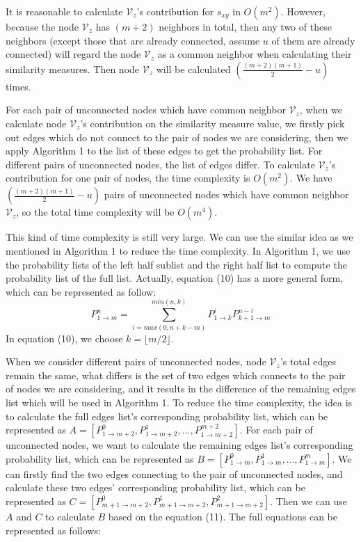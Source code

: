 \documentclass[\main/thesis.tex]{subfiles}
\begin{document}
It is reasonable to calculate $\mathcal{V}_z$'s contribution for $s_{xy}$ in $O(m^2)$. However, because the node $\mathcal{V}_z$ has $(m+2)$ neighbors in total, then any two of these neighbors (except those that are already connected, assume $u$ of them are already connected) will regard the node $\mathcal{V}_z$ as a common neighbor when calculating their similarity measures. Then node $\mathcal{V}_z$ will be calculated $(\frac{(m+2)(m+1)}{2}-u)$ times. 


For each pair of unconnected nodes which have common neighbor $\mathcal{V}_z$, when we calculate node $\mathcal{V}_z$'s contribution on the similarity measure value, we firstly pick out edges which do not connect to the pair of nodes we are considering, then we apply Algorithm 1 to the list of these edges to get the probability list. For different pairs of unconnected nodes, the list of edges differ. To calculate $\mathcal{V}_z$'s contribution for one pair of nodes, the time complexity is $O(m^2)$. We have $(\frac{(m+2)(m+1)}{2}-u)$ pairs of unconnected nodes which have common neighbor $\mathcal{V}_z$, so the total time complexity will be $O(m^4)$.

This kind of time complexity is still very large. We can use the similar idea as we mentioned in Algorithm 1 to reduce the time complexity. In Algorithm 1, we use the probability lists of the left half sublist and the right half list to compute the probability list of the full list. Actually, equation (10) has a more general form, which can be represented as follow:
\begin{equation}
P_{1\rightarrow m}^n=\sum_{i=max(0,n+k-m)}^{min(n,k)}P_{1\rightarrow k}^i P_{k+1\rightarrow m}^{n-i}
\end{equation}
In equation (10), we choose $k=\lfloor m/2 \rfloor$.

When we consider different pairs of unconnected nodes, node $\mathcal{V}_z$'s total edges remain the same, what differs is the set of two edges which connects to the pair of nodes we are considering, and it results in the difference of the remaining edges list which will be used in Algorithm 1. To reduce the time complexity, the idea is to calculate the full edges list's corresponding probability list, which can be represented as $A = [P_{1\rightarrow m+2}^0, P_{1\rightarrow m+2}^1, ..., P_{1\rightarrow m+2}^{m+2}]$. For each pair of unconnected nodes, we want to calculate the remaining edges list's corresponding probability list, which can be represented as $B = [P_{1\rightarrow m}^0, P_{1\rightarrow m}^1, ..., P_{1\rightarrow m}^{m}]$. We can firstly find the two edges connecting to the pair of unconnected nodes, and calculate these two edges' corresponding probability list, which can be represented as $C = [P_{m+1\rightarrow m+2}^0, P_{m+1\rightarrow m+2}^1, P_{m+1\rightarrow m+2}^2]$. Then we can use $A$ and $C$ to calculate $B$ based on the equation (11). The full equations can be represented as follows:
\end{document}
